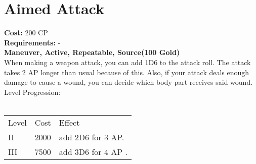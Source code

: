 \section{Aimed Attack}
\textbf{Cost:} 200 CP\\
\textbf{Requirements:} -\\
\textbf{Maneuver, Active, Repeatable, Source(100 Gold)}\\
When making a weapon attack, you can add 1D6 to the attack roll. The attack takes 2 AP longer than usual because of this. Also, if your attack deals enough damage to cause a wound, you can decide which body part receives said wound.
\\
Level Progression:\\
\\
\begin{tabular}{l | l | l}
	Level & Cost & Effect\\
	II & 2000 & add 2D6 for 3 AP.\\
	III & 7500 & add 3D6 for 4 AP .\\
\end{tabular}